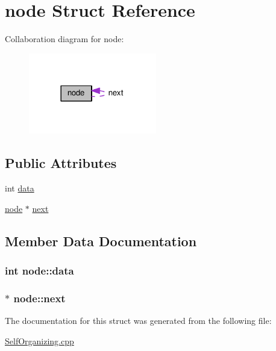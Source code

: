 \hypertarget{structnode}{}\section{node Struct Reference}
\label{structnode}


Collaboration diagram for node\+:
\nopagebreak
\begin{figure}[H]
\begin{center}
\leavevmode
\includegraphics[width=158pt]{structnode__coll__graph}
\end{center}
\end{figure}
\subsection*{Public Attributes}
\begin{DoxyCompactItemize}
\item 
int \hyperlink{structnode_a2d890bb9f6af0ffd73fe79b21124c2a2}{data}
\item 
\hyperlink{structnode}{node} $\ast$ \hyperlink{structnode_aad210fa7c160a49f6b9a3ffee592a2bc}{next}
\end{DoxyCompactItemize}


\subsection{Member Data Documentation}
\subsubsection[{\texorpdfstring{data}{data}}]{\setlength{\rightskip}{0pt plus 5cm}int node\+::data}\hypertarget{structnode_a2d890bb9f6af0ffd73fe79b21124c2a2}{}\label{structnode_a2d890bb9f6af0ffd73fe79b21124c2a2}
\subsubsection[{\texorpdfstring{next}{next}}]{$\ast$ node\+::next}\hypertarget{structnode_aad210fa7c160a49f6b9a3ffee592a2bc}{}\label{structnode_aad210fa7c160a49f6b9a3ffee592a2bc}


The documentation for this struct was generated from the following file\+:\begin{DoxyCompactItemize}
\item 
\hyperlink{SelfOrganizing_8cpp}{Self\+Organizing.\+cpp}\end{DoxyCompactItemize}
